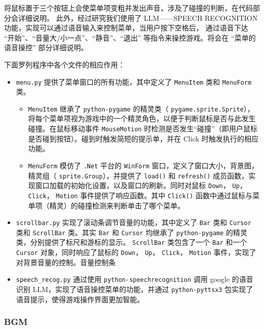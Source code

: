 \documentclass[12pt, twoside, a4paper]{article}
\newcommand{\inlinecode}[1]{\setlength{\fboxsep}{0.8mm} \colorbox{lightgray!40}{\texttt{#1}}}
\begin{document}
将鼠标置于三个按钮上会使菜单项变粗并发出声音，涉及了碰撞的判断，在代码部分会详细说明。
此外，经过研究我们使用了 LLM——SPEECH RECOGNITION 功能，实现可以通过语音输入来控制菜单，当用户按下空格后，
通过语音下达 “开始”、“音量大/小一点”、“静音”、“退出” 等指令来操控游戏。将会在 “菜单的语音操控” 部分详细说明。

下面罗列程序中各个文件的相应作用：
\begin{itemize}
    \item \inlinecode{menu.py} 提供了菜单窗口的所有功能，其中定义了 \inlinecode{MenuItem} 类和 \inlinecode{MenuForm} 类。
          \begin{itemize}
              \item \inlinecode{MenuItem} 继承了 \inlinecode{python-pygame} 的精灵类（\inlinecode{pygame.sprite.Sprite}），将每个菜单项视为游戏中的一个精灵角色，以便于判断鼠标是否与此发生碰撞。在鼠标移动事件 \inlinecode{MouseMotion} 时检测是否发生“碰撞”（即用户鼠标是否碰到按钮）。碰到时触发简短的提示单，并在 Click 时触发执行的相应功能。
              \item \inlinecode{MenuForm} 模仿了 \inlinecode{.Net} 平台的 \inlinecode{WinForm} 窗口，定义了窗口大小，背景图，精灵组（\inlinecode{sprite.Group}），并提供了 \inlinecode{load()} 和 \inlinecode{refresh()} 成员函数，实现窗口加载的初始化设置，以及窗口的刷新。同时对鼠标 \inlinecode{Down}，\inlinecode{Up}，\inlinecode{Click}，\inlinecode{Motion} 事件提供了响应函数。其中 \inlinecode{Click()} 函数中通过鼠标与菜单项（精灵）的碰撞检测来判断单击了哪个菜单。
          \end{itemize}
    \item \inlinecode{scrollbar.py} 实现了滚动条调节音量的功能，其中定义了 \inlinecode{Bar} 类和 \inlinecode{Cursor} 类和 \inlinecode{ScrollBar} 类。其实 \inlinecode{Bar} 和 \inlinecode{Cursor} 均继承了 \inlinecode{python-pygame} 的精灵类，分别提供了标尺和游标的显示。\inlinecode{ScrollBar} 类包含了一个 \inlinecode{Bar} 和一个 \inlinecode{Cursor} 对象，同时响应了鼠标的 \inlinecode{Down}，\inlinecode{Up}，\inlinecode{Click}，\inlinecode{Motion} 事件，实现了对背景音量的控制。音量控制条
    \item \inlinecode{speech\_recog.py} 通过使用 \inlinecode{python-speechrecognition} 调用 google 的语音识别 LLM，实现了语音操控菜单的功能，并通过 \inlinecode{python-pyttsx3} 包实现了语音提示，使得游戏操作界面更加智能。
\end{itemize}

\subsubsection{BGM}
\end{document}
